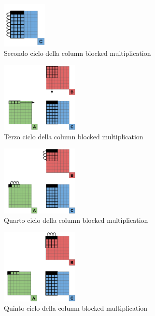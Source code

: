 \documentclass[conference]{IEEEtran}
\begin{document}
\begin{figure}[H]
    \centering
    \includegraphics[width=0.2\textwidth]{resources/column_blocked_2.png}
    \caption{Secondo ciclo della column blocked multiplication}
    \label{fig:column_blocked_2}
\end{figure}
\begin{figure}[H]
    \centering
    \includegraphics[width=0.35\textwidth]{resources/column_blocked_3.png}
    \caption{Terzo ciclo della column blocked multiplication}
    \label{fig:column_blocked_3}
\end{figure}
\begin{figure}[H]
    \centering
    \includegraphics[width=0.35\textwidth]{resources/column_blocked_4.png}
    \caption{Quarto ciclo della column blocked multiplication}
    \label{fig:column_blocked_4}
\end{figure}
\begin{figure}[H]
    \centering
    \includegraphics[width=0.35\textwidth]{resources/column_blocked_5.png}
    \caption{Quinto ciclo della column blocked multiplication}
    \label{fig:column_blocked_5}
\end{figure}
\end{document}
